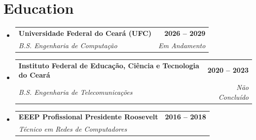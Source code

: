 \documentclass[letterpaper,11pt]{article}
\makeatletter
\newcommand{\resumeSubheading}[4]{
  \vspace{-2pt}\item
    \begin{tabular*}{1.0\textwidth}[t]{l@{\extracolsep{\fill}}r}
      \textbf{#1} & \textbf{\small #2} \\
      \textit{\small#3} & \textit{\small #4} \\
    \end{tabular*}\vspace{-7pt}
}
\newcommand{\resumeSubHeadingListStart}{\begin{itemize}[leftmargin=0.0in, label={}]}
\newcommand{\resumeSubHeadingListEnd}{\end{itemize}}
\makeatother
\begin{document}
\section{Education}
\begin{minipage}{\dimexpr\textwidth-0.2cm}
  \hspace*{0.2cm}
  \begin{minipage}{\dimexpr\textwidth}
    \resumeSubHeadingListStart
    \resumeSubheading
        {Universidade Federal do Ceará (UFC)}{2026 -- 2029}
        {B.S. Engenharia de Computação}{Em Andamento}
      \resumeSubheading
        {Instituto Federal de Educação, Ciência e Tecnologia do Ceará}{2020 -- 2023}
        {B.S. Engenharia de Telecomunicações}{Não Concluído}
      \resumeSubheading
        {EEEP Profissional Presidente Roosevelt}{2016 -- 2018}
        {Técnico em Redes de Computadores}{}
    \resumeSubHeadingListEnd
  \end{minipage}
\end{minipage}
\vspace{10pt}


\end{document}
